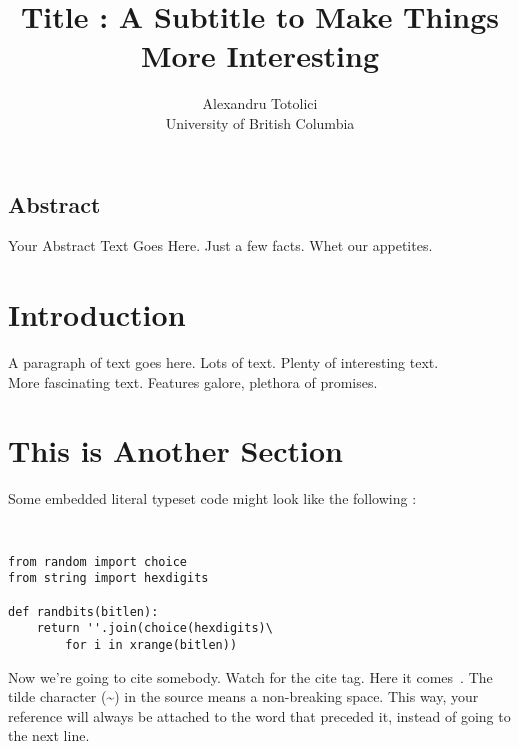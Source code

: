 \documentclass[letterpaper,twocolumn,10pt]{article}
\begin{document}
\date{}

\title{\Large \bf Title : A Subtitle to Make Things More Interesting}

\author{
{\rm Alexandru Totolici}\\
University of British Columbia
} %

\maketitle

\thispagestyle{empty}


\subsection*{Abstract}
Your Abstract Text Goes Here.  Just a few facts.
Whet our appetites.

\section{Introduction}

A paragraph of text goes here.  Lots of text.  Plenty of interesting
text. \\

More fascinating text. Features galore, plethora of promises.\\

\section{This is Another Section}

Some embedded literal typeset code might
look like the following :

{\tt \small
\begin{verbatim}
from random import choice
from string import hexdigits

def randbits(bitlen):
    return ''.join(choice(hexdigits)\
        for i in xrange(bitlen))
\end{verbatim}
}

Now we're going to cite somebody.  Watch for the cite tag.
Here it comes~\cite{Diffie:1976:MCT:1499799.1499815}.  The tilde character (\~{})
in the source means a non-breaking space.  This way, your reference will
always be attached to the word that preceded it, instead of going to the
next line.
\end{document}
